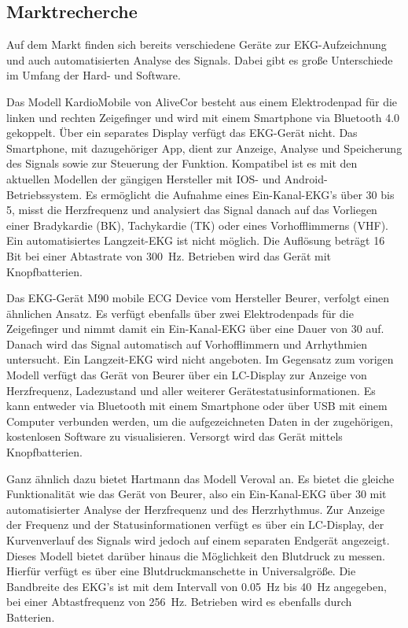 \subsection{Marktrecherche}

Auf dem Markt finden sich bereits verschiedene Geräte zur EKG-Aufzeichnung und auch automatisierten Analyse des Signals. Dabei gibt es große Unterschiede im Umfang der Hard- und Software.

Das Modell KardioMobile von AliveCor besteht aus einem Elektrodenpad für die linken und rechten Zeigefinger und wird mit einem Smartphone via Bluetooth 4.0 gekoppelt. Über ein separates Display verfügt das EKG-Gerät nicht. Das Smartphone, mit dazugehöriger App, dient zur Anzeige, Analyse und Speicherung des Signals sowie zur Steuerung der Funktion. Kompatibel ist es mit den aktuellen Modellen der gängigen Hersteller mit IOS- und Android-Betriebssystem. Es ermöglicht die Aufnahme eines Ein-Kanal-EKG's über \SI{30}{\sec} bis \SI{5}{\min}, misst die Herzfrequenz und analysiert das Signal danach auf das Vorliegen einer Bradykardie (BK), Tachykardie (TK) oder eines Vorhofflimmerns (VHF). Ein automatisiertes Langzeit-EKG ist nicht möglich. Die Auflösung beträgt 16 Bit bei einer Abtastrate von \SI{300}{\hertz}. Betrieben wird das Gerät mit Knopfbatterien.

Das EKG-Gerät M90 mobile ECG Device vom Hersteller Beurer, verfolgt einen ähnlichen Ansatz. Es verfügt ebenfalls über zwei Elektrodenpads für die Zeigefinger und nimmt damit ein Ein-Kanal-EKG über eine Dauer von \SI{30}{\sec} auf. Danach wird das Signal automatisch auf Vorhofflimmern und Arrhythmien untersucht. Ein Langzeit-EKG wird nicht angeboten. Im Gegensatz zum vorigen Modell verfügt das Gerät von Beurer über ein LC-Display zur Anzeige von Herzfrequenz, Ladezustand und aller weiterer Gerätestatusinformationen. Es kann entweder via Bluetooth mit einem Smartphone oder über USB mit einem Computer verbunden werden, um die aufgezeichneten Daten in der zugehörigen, kostenlosen Software zu visualisieren. Versorgt wird das Gerät mittels Knopfbatterien.

Ganz ähnlich dazu bietet Hartmann das Modell Veroval an. Es bietet die gleiche Funktionalität wie das Gerät von Beurer, also ein Ein-Kanal-EKG über \SI{30}{\sec} mit automatisierter Analyse der Herzfrequenz und des Herzrhythmus. Zur Anzeige der Frequenz und der Statusinformationen verfügt es über ein LC-Display, der Kurvenverlauf des Signals wird jedoch auf einem separaten Endgerät angezeigt. Dieses Modell bietet darüber hinaus die Möglichkeit den Blutdruck zu messen. Hierfür verfügt es über eine Blutdruckmanschette in Universalgröße. Die Bandbreite des EKG's ist mit dem Intervall von \SI{0.05} {\hertz} bis \SI{40} {\hertz} angegeben, bei einer Abtastfrequenz von \SI{256} {\hertz}. Betrieben wird es ebenfalls durch Batterien. 

